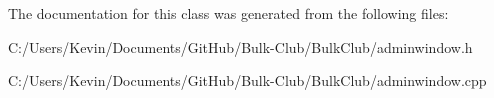 The documentation for this class was generated from the following files\+:\begin{DoxyCompactItemize}
\item 
C\+:/\+Users/\+Kevin/\+Documents/\+Git\+Hub/\+Bulk-\/\+Club/\+Bulk\+Club/adminwindow.\+h\item 
C\+:/\+Users/\+Kevin/\+Documents/\+Git\+Hub/\+Bulk-\/\+Club/\+Bulk\+Club/adminwindow.\+cpp\end{DoxyCompactItemize}
